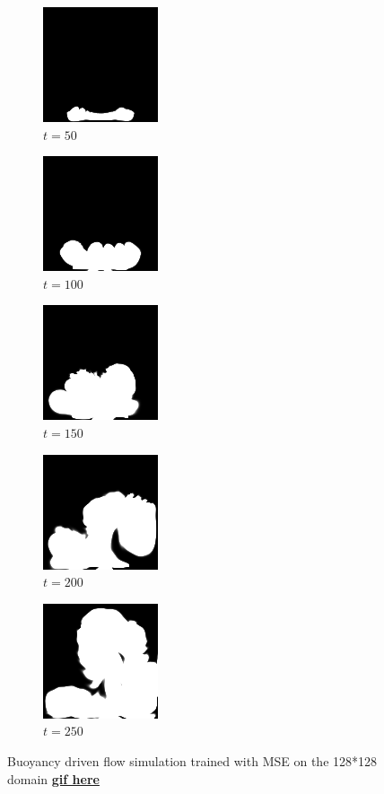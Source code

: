 \documentclass[a4paper,12pt,twoside]{report}
\begin{document}
\begin{figure}
	\centering
	\begin{subfigure}{0.18\textwidth}
		\centering
		\includegraphics[scale=0.56]{buoyancy_test/dens_000050_mse.png}
		\caption{$t=50$}
	\end{subfigure}
	\begin{subfigure}{0.18\textwidth}
		\centering
		\includegraphics[scale=0.56]{buoyancy_test/dens_000100_mse.png}
		\caption{$t=100$}
	\end{subfigure}
	\begin{subfigure}{0.18\textwidth}
		\centering
		\includegraphics[scale=0.56]{buoyancy_test/dens_000150_mse.png}
		\caption{$t=150$}
	\end{subfigure}
	\begin{subfigure}{0.18\textwidth}
		\centering
		\includegraphics[scale=0.56]{buoyancy_test/dens_000200_mse.png}
		\caption{$t=200$}
	\end{subfigure}
	\begin{subfigure}{0.18\textwidth}
		\centering
		\includegraphics[scale=0.56]{buoyancy_test/dens_000249_mse.png}
		\caption{$t=250$}
	\end{subfigure}
	\caption{Buoyancy driven flow simulation trained with MSE on the 128*128 domain \href{https://github.com/w191444052/sol-data/blob/master/buoyancy_high/mse.gif}{\bf{gif here}}}
	\label{sol buoyancy high mse}
\end{figure}
\end{document}
